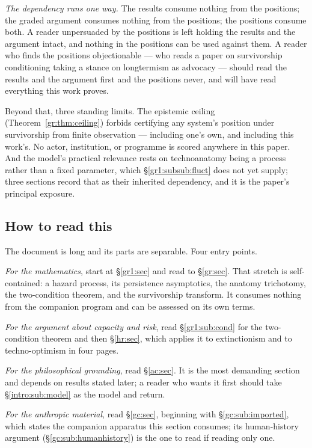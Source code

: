 \documentclass[11pt]{article}
\numberwithin{equation}{section}
\theoremstyle{plain}
\theoremstyle{definition}
\theoremstyle{remark}
\begin{document}
\emph{The dependency runs one way.} The results consume nothing from the
positions; the graded argument consumes nothing from the positions; the
positions consume both. A reader unpersuaded by the positions is left
holding the results and the argument intact, and nothing in the positions
can be used against them. A reader who finds the positions objectionable
--- who reads a paper on survivorship conditioning taking a stance on
longtermism as advocacy --- should read the results and the argument
first and the positions never, and will have read everything this work
proves.

Beyond that, three standing limits. The epistemic ceiling
(Theorem~\ref{gr:thm:ceiling}) forbids certifying any system's position
under survivorship from finite observation --- including one's own, and
including this work's. No actor, institution, or programme is scored
anywhere in this paper. And the model's practical relevance rests on
technoanatomy being a process rather than a fixed parameter, which
\S\ref{gr1:subsub:fluct} does not yet supply; three sections record that
as their inherited dependency, and it is the paper's principal exposure.

\subsection{How to read this}\label{intro:sub:reading}

The document is long and its parts are separable. Four entry points.

\emph{For the mathematics}, start at \S\ref{gr1:sec} and read to
\S\ref{gr:sec}. That stretch is self-contained: a hazard process, its
persistence asymptotics, the anatomy trichotomy, the two-condition
theorem, and the survivorship transform. It consumes nothing from the
companion program and can be assessed on its own terms.

\emph{For the argument about capacity and risk}, read
\S\ref{gr1:sub:cond} for the two-condition theorem and then
\S\ref{hr:sec}, which applies it to extinctionism and to
techno-optimism in four pages.

\emph{For the philosophical grounding}, read \S\ref{ac:sec}. It is the
most demanding section and depends on results stated later; a reader who
wants it first should take \S\ref{intro:sub:model} as the model and
return.

\emph{For the anthropic material}, read \S\ref{gc:sec}, beginning with
\S\ref{gc:sub:imported}, which states the companion apparatus this
section consumes; its human-history argument
(\S\ref{gc:sub:humanhistory}) is the one to read if reading only one.
\end{document}
